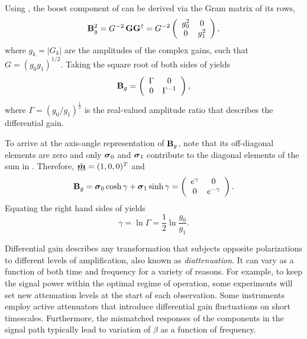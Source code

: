 Using , the boost component of 
%
can be derived via the Gram matrix of its rows,
%
\begin{equation}
\label{eqn:diff_gain_squared}
{\bf B}_g^2 = G^{-2} \, {\bf G}{\bf G}^\dagger
= G^{-2} 
  	\left( \begin{array}{cc}
		g_0^2 & 0 \\
		0   & g_1^2
	\end{array} \right),
\end{equation}
where $g_k = |G_k|$ are the amplitudes of the complex gains, such that $G=(g_0 g_1)^{1/2}$.
%
Taking the square root of both sides of  yields
\begin{equation}
{\bf B}_g
 =
  \left( \begin{array}{cc}
    \Gamma & 0 \\
    0   & \Gamma^{-1}
  \end{array} \right),
\label{eqn:boost_decomposed}
\end{equation}
where $\Gamma=(g_0/g_1)^\frac{1}{2}$ is the real-valued amplitude ratio that describes the differential gain.
%

To arrive at the axis-angle representation of ${\bf B}_g$,
%
%
note that its off-diagonal elements are zero and
%
%
only $\mbox{\boldmath $\sigma$}_{0}$ and $\mbox{\boldmath $\sigma$}_{1}$ contribute to the diagonal elements of 
the sum in .
Therefore, $\hat{\underline{\mbox{\boldmath $m$}}}=(1,0,0)^T$ and
\begin{equation}
{\bf B}_g = \mbox{\boldmath $\sigma$}_{0}\cosh\gamma + \mbox{\boldmath $\sigma$}_{1}\sinh\gamma = \left( \begin{array}{cc}
		e^\gamma & 0 \\
		0   & e^{-\gamma}
	\end{array} \right).
\label{eqn:diff_gain}
\end{equation}
Equating the right hand sides of  yields 
\begin{equation}
	\label{eqn:differential_gain}
	\gamma = \ln\Gamma = \frac{1}{2} \ln \frac{g_0}{g_1}.
\end{equation}

Differential gain describes any transformation that subjects opposite polarizations to different levels of amplification, also known as \emph{diattenuation}.
%
It can vary as a function of both time and frequency for a variety of reasons.  For example, to keep the signal power within the optimal regime of operation, some experiments will set new attenuation levels at the start of each observation.
%
Some instruments employ active attenuators that introduce differential gain fluctuations on short timescales.  
%
Furthermore, the mismatched responses of the components in the signal path typically lead to variation of $\beta$ as a function of frequency.

